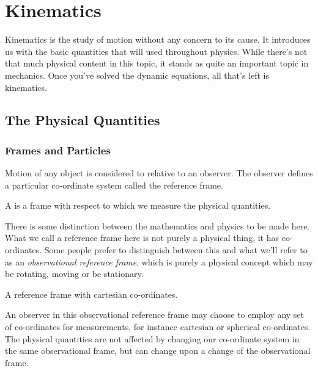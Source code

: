 \setlength{\chnumsep}{10em}
\chapter{Kinematics}


\begin{overview}
    Kinematics is the study of motion without any concern to its cause. It introduces us with the 
    basic quantities that will used throughout physics. While there's not that much physical content in this 
    topic, it stands as quite an important topic in mechanics. Once you've solved the dynamic equations, all 
    that's left is kinematics.
\end{overview}

\section{The Physical Quantities}
\subsection{Frames and Particles}

Motion of any object is considered to relative to an observer. The observer defines a
particular co-ordinate system called the reference frame.

\begin{definition}
    A  is a frame with respect to 
    which we measure the physical quantities.
\end{definition}


There is some distinction between the mathematics and physics to be made here.
What we call a reference frame here is not purely a physical thing, it has co-ordinates.
Some people prefer to distinguish between this and what we'll refer to as an \emph{observational reference frame},
which is purely a physical concept which may be rotating, moving or be stationary.  

\begin{marginfigure}
    \vspace{-4em}
    \caption{A reference frame with cartesian co-ordinates.}
\end{marginfigure}

An observer in this observational reference frame may choose to employ any set of co-ordinates for measurements,
for instance cartesian or spherical co-ordinates. The physical quantities are not affected by changing our 
co-ordinate system in the same observational frame, but can change upon a change of the observational frame.


